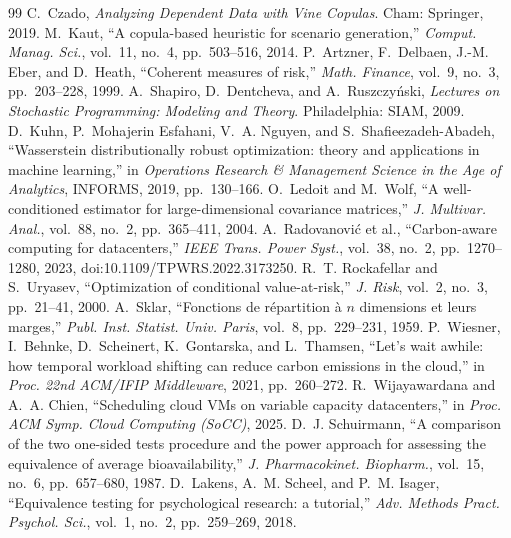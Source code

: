 \documentclass[10pt,twocolumn]{article}
\begin{document}
\begin{thebibliography}{99}
 C.~Czado, \emph{Analyzing Dependent Data with Vine Copulas}.
Cham: Springer, 2019.
 M.~Kaut, ``A copula-based heuristic for scenario generation,''
\emph{Comput. Manag. Sci.}, vol.~11, no.~4, pp.~503--516, 2014.
 P.~Artzner, F.~Delbaen, J.-M. Eber, and D.~Heath, ``Coherent
measures of risk,'' \emph{Math. Finance}, vol.~9, no.~3, pp.~203--228, 1999.
 A.~Shapiro, D.~Dentcheva, and A.~Ruszczy\'nski, \emph{Lectures
on Stochastic Programming: Modeling and Theory}. Philadelphia: SIAM, 2009.
 D.~Kuhn, P.~Mohajerin Esfahani, V.~A. Nguyen, and
S.~Shafieezadeh-Abadeh, ``Wasserstein distributionally robust optimization: theory
and applications in machine learning,'' in \emph{Operations Research \& Management
Science in the Age of Analytics}, INFORMS, 2019, pp.~130--166.
 O.~Ledoit and M.~Wolf, ``A well-conditioned estimator for
large-dimensional covariance matrices,'' \emph{J. Multivar. Anal.}, vol.~88,
no.~2, pp.~365--411, 2004.
 A.~Radovanovi\'c et al., ``Carbon-aware computing for
datacenters,'' \emph{IEEE Trans. Power Syst.}, vol.~38, no.~2, pp.~1270--1280,
2023, doi:10.1109/TPWRS.2022.3173250.
 R.~T. Rockafellar and S.~Uryasev, ``Optimization of
conditional value-at-risk,'' \emph{J. Risk}, vol.~2, no.~3, pp.~21--41, 2000.
 A.~Sklar, ``Fonctions de r\'epartition \`a $n$ dimensions et
leurs marges,'' \emph{Publ. Inst. Statist. Univ. Paris}, vol.~8, pp.~229--231,
1959.
 P.~Wiesner, I.~Behnke, D.~Scheinert, K.~Gontarska, and
L.~Thamsen, ``Let's wait awhile: how temporal workload shifting can reduce carbon
emissions in the cloud,'' in \emph{Proc. 22nd ACM/IFIP Middleware}, 2021,
pp.~260--272.
 R.~Wijayawardana and A.~A. Chien, ``Scheduling cloud
VMs on variable capacity datacenters,'' in \emph{Proc. ACM Symp. Cloud Computing
(SoCC)}, 2025.
 D.~J. Schuirmann, ``A comparison of the two one-sided tests
procedure and the power approach for assessing the equivalence of average
bioavailability,'' \emph{J. Pharmacokinet. Biopharm.}, vol.~15, no.~6,
pp.~657--680, 1987.
 D.~Lakens, A.~M. Scheel, and P.~M. Isager, ``Equivalence
testing for psychological research: a tutorial,'' \emph{Adv. Methods Pract. Psychol.
Sci.}, vol.~1, no.~2, pp.~259--269, 2018.
\end{thebibliography}

\appendix
\end{document}
